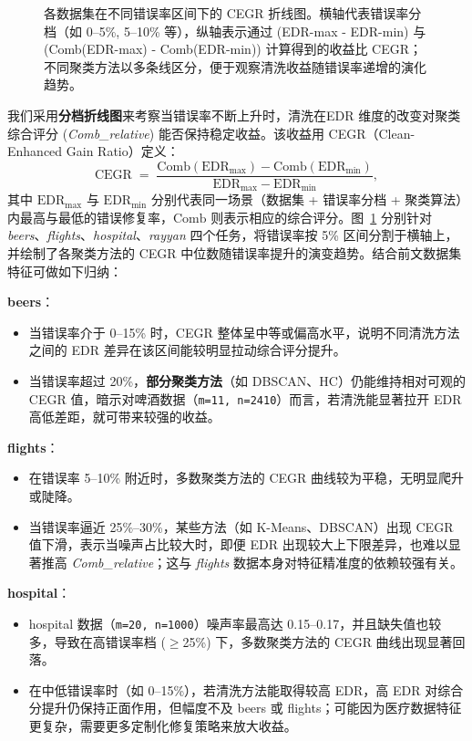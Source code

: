 \documentclass[10pt]{article} %
\numberwithin{equation}{section}
\begin{document}
\begin{enumerate}[label=(\alph*)]
\begin{figure}[htbp]
    \caption{各数据集在不同错误率区间下的 CEGR 折线图。横轴代表错误率分档（如 0--5\%, 5--10\% 等），纵轴表示通过 (EDR-max - EDR-min) 与 (Comb(EDR-max) - Comb(EDR-min)) 计算得到的收益比 CEGR；不同聚类方法以多条线区分，便于观察清洗收益随错误率递增的演化趋势。}
    \label{fig:cegr_lineplots}
\end{figure}
我们采用\textbf{分档折线图}来考察当错误率不断上升时，清洗在EDR 维度的改变对聚类综合评分 (\textit{Comb\_relative}) 能否保持稳定收益。该收益用 CEGR（Clean-Enhanced Gain Ratio）定义：
\[
  \mathrm{CEGR} \;=\; \frac{\mathrm{Comb}(\mathrm{EDR}_{\max}) - \mathrm{Comb}(\mathrm{EDR}_{\min})}{\mathrm{EDR}_{\max} - \mathrm{EDR}_{\min}},
\]
其中 \(\mathrm{EDR}_{\max}\) 与 \(\mathrm{EDR}_{\min}\) 分别代表同一场景（数据集 + 错误率分档 + 聚类算法）内最高与最低的错误修复率，\(\mathrm{Comb}\) 则表示相应的综合评分。图~\ref{fig:cegr_lineplots} 分别针对 \textit{beers}、\textit{flights}、\textit{hospital}、\textit{rayyan} 四个任务，将错误率按 5\% 区间分割于横轴上，并绘制了各聚类方法的 CEGR 中位数随错误率提升的演变趋势。结合前文数据集特征可做如下归纳：

\textbf{beers}：
    \begin{itemize}
        \item 当错误率介于 0--15\% 时，CEGR 整体呈中等或偏高水平，说明不同清洗方法之间的 EDR 差异在该区间能较明显拉动综合评分提升。
        \item 当错误率超过 20\%，\textbf{部分聚类方法}（如 DBSCAN、HC）仍能维持相对可观的 CEGR 值，暗示对啤酒数据（\texttt{m=11, n=2410}）而言，若清洗能显著拉开 EDR 高低差距，就可带来较强的收益。
    \end{itemize}

\textbf{flights}：
    \begin{itemize}
        \item 在错误率 5--10\% 附近时，多数聚类方法的 CEGR 曲线较为平稳，无明显爬升或陡降。
        \item 当错误率逼近 25\%--30\%，某些方法（如 K-Means、DBSCAN）出现 CEGR 值下滑，表示当噪声占比较大时，即便 EDR 出现较大上下限差异，也难以显著推高 \textit{Comb\_relative}；这与 \textit{flights} 数据本身对特征精准度的依赖较强有关。
    \end{itemize}

\textbf{hospital}：
    \begin{itemize}
        \item hospital 数据（\texttt{m=20, n=1000}）噪声率最高达 0.15--0.17，并且缺失值也较多，导致在高错误率档 (\(\geq\)25\%) 下，多数聚类方法的 CEGR 曲线出现显著回落。
        \item 在中低错误率时（如 0--15\%），若清洗方法能取得较高 EDR，高 EDR 对综合分提升仍保持正面作用，但幅度不及 beers 或 flights；可能因为医疗数据特征更复杂，需要更多定制化修复策略来放大收益。
    \end{itemize}


\end{enumerate}
\end{document}
